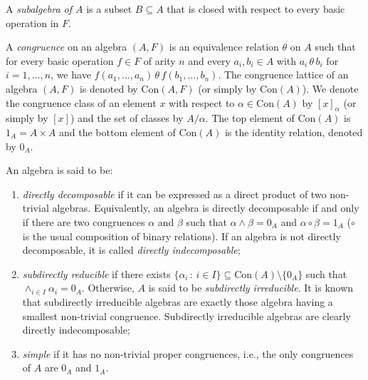 \documentclass[a4paper, english, 9pt]{amsart}
\theoremstyle{plain}
\theoremstyle{definition}
\def\con{\mathrm{Con}}
\def\setof#1#2{\{#1\,\colon\,#2\}}
\begin{document}





A \emph{subalgebra of $A$} is a subset $B\subseteq A$ that is closed with respect to every basic operation in $F$.

A \emph{congruence} on an algebra $(A,F)$ is an equivalence relation $\theta$ on $A$ such that for every basic operation $f \in F$ of arity $n$ and every $a_i, b_i \in A$ with $a_i\, \theta\, b_i$ for $i = 1, \ldots, n$, we have $f(a_1, \ldots, a_n)\,\theta\, f(b_1, \ldots, b_n)$. The congruence lattice of an algebra $(A,F)$ is denoted by $\con(A,F)$ (or simply by $\con(A)$). We denote the congruence class of an element $x$ with respect to $\alpha\in \con(A)$ by $[x]_\alpha$ (or simply by $[x]$) and the set of classes by $A/\alpha$. The top element of $\con(A)$ is $1_A=A\times A$ and the bottom element of $\con(A)$ is the identity relation, denoted by $0_A$.


An algebra is said to be:

\begin{enumerate}
    \item \emph{directly decomposable} if it can be expressed as a direct product of two non-trivial algebras. Equivalently, an algebra is directly decomposable if and only if there are two congruences $\alpha$ and $\beta$ such that $\alpha\wedge\beta=0_A$ and $\alpha\circ\beta=1_A$ ($\circ$ is the usual composition of binary relations). If an algebra is not directly decomposable, it is called \emph{directly indecomposable};




\item \emph{subdirectly reducible} if there exists $\setof{\alpha_i}{i\in I}\subseteq \con(A)\setminus \{0_A\}$ such that $\wedge_{i\in I} \alpha_i= 0_A$. Otherwise, $A$ is said to be {\it subdirectly irreducible}. It is known that subdirectly irreducible algebras are exactly those algebra having a smallest non-trivial congruence. Subdirectly irreducible algebras are clearly directly indecomposable;

\item \emph{simple} if it has no non-trivial proper congruences, i.e., the only congruences of $A$ are $0_A$ and $1_A$. %
\end{enumerate}
\end{document}
